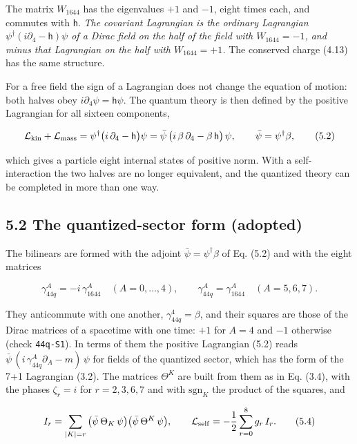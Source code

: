 \documentclass[
  10pt,
]{article}
\begin{document}
The matrix \(W_{1644}\) has the eigenvalues \(+1\) and \(-1\), eight
times each, and commutes with \(\mathsf h\). \emph{The covariant
Lagrangian is the ordinary Lagrangian
\(\psi^\dagger(i\partial_4-\mathsf h)\psi\) of a Dirac field on the half
of the field with \(W_{1644}=-1\), and minus that Lagrangian on the half
with \(W_{1644}=+1\).} The conserved charge (4.13) has the same
structure.

For a free field the sign of a Lagrangian does not change the equation
of motion: both halves obey \(i\partial_4\psi=\mathsf h\psi\). The
quantum theory is then defined by the positive Lagrangian for all
sixteen components,

\[\mathcal L_{\rm kin}+\mathcal L_{\rm mass}=\psi^\dagger\big(i\,\partial_4-\mathsf h\big)\psi
=\bar\psi\,\big(i\,\beta\,\partial_4-\beta\,\mathsf h\big)\,\psi,\qquad\bar\psi=\psi^\dagger\beta,\tag{5.2}\]

which gives a particle eight internal states of positive norm. With a
self-interaction the two halves are no longer equivalent, and the
quantized theory can be completed in more than one way.

\hypertarget{the-quantized-sector-form-adopted}{%
\subsection{5.2 The quantized-sector form
(adopted)}\label{the-quantized-sector-form-adopted}}

The bilinears are formed with the adjoint \(\bar\psi=\psi^\dagger\beta\)
of Eq. (5.2) and with the eight matrices

\[\gamma_{44q}^A=-i\,\gamma_{1644}^A\quad(A=0,\dots,4),\qquad
\gamma_{44q}^A=\gamma_{1644}^A\quad(A=5,6,7).\tag{5.3}\]

They anticommute with one another, \(\gamma_{44q}^4=\beta\), and their
squares are those of the Dirac matrices of a spacetime with one time:
\(+1\) for \(A=4\) and \(-1\) otherwise (check \texttt{44q-S1}). In
terms of them the positive Lagrangian (5.2) reads
\(\bar\psi\,(i\,\gamma_{44q}^A\partial_A-m)\,\psi\) for fields of the
quantized sector, which has the form of the 7+1 Lagrangian (3.2). The
matrices \(\Theta^K\) are built from them as in Eq. (3.4), with the
phases \(\zeta_r=i\) for \(r=2,3,6,7\) and with \(\mathrm{sgn}_K\) the
product of the squares, and

\[I_r=\sum_{|K|=r}\big(\bar\psi\,\Theta_K\,\psi\big)\big(\bar\psi\,\Theta^K\,\psi\big),\qquad
\mathcal L_{\rm self}=-\frac12\sum_{r=0}^{8}g_r\,I_r.\tag{5.4}\]
\end{document}
